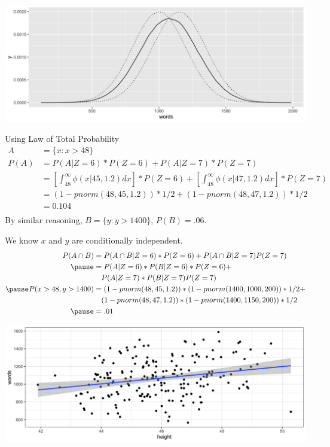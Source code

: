 \documentclass[aspectratio=169, handout]{beamer}
\numberwithin{equation}{section}
\begin{document}
\begin{frame}
\begin{center}
\includegraphics[width=5 in]{Wordsdensity.png}
\end{center}
\end{frame}

\begin{frame}{Using Law of Total Probability}
\begin{align*}
A&=\{x: x>48\}\\
P(A)&=P(A|Z=6)*P(Z=6)+P(A|Z=7)*P(Z=7)\\
&=[\int_{48}^\infty \phi(x|45,1.2)dx]*P(Z=6)+[\int_{48}^\infty \phi(x|47,1.2)dx]*P(Z=7)\\
&=(1-pnorm(48, 45, 1.2) )*1/2+(1-pnorm(48, 47, 1.2) )*1/2\\
&=0.104\\
\end{align*}
By similar reasoning, $B=\{y: y>1400\}$, $P(B)=.06$.\\
\end{frame}




\begin{frame}
We know $x$ and $y$ are conditionally independent.
\begin{align*}
P(A\cap B)&=P(A\cap B|Z=6)*P(Z=6)+P(A\cap B|Z=7)P(Z=7)\\ \pause
&=P(A|Z=6)*P(B|Z=6)*P(Z=6)+\\
&\quad P(A|Z=7)*P(B|Z=7)P(Z=7)\\\pause
P(x>48, y>1400)&=(1-pnorm(48, 45,1.2) )*(1-pnorm(1400, 1000, 200) )*1/2+\\
&\quad (1-pnorm(48, 47, 1.2) )*(1-pnorm(1400, 1150, 200) )*1/2 \\\pause
&=.01
\end{align*}
\end{frame}

\begin{frame}
\begin{center}
\includegraphics[width=5 in]{Heightwords.png}
\end{center}
\end{frame}
\end{document}
